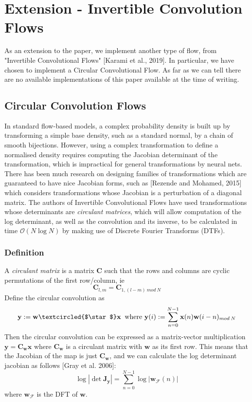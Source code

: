 \chapter{Extension - Invertible Convolution Flows}

As an extension to the paper, we implement another type of flow, from "Invertible Convolutional Flows" [Karami et al., 2019]. In particular, we have chosen to implement a Circular Convolutional Flow. As far as we can tell there are no available implementations of this paper available at the time of writing.

\section{Circular Convolution Flows}
In standard flow-based models, a complex probability density is built up by transforming a simple base density, such as a standard normal, by a chain of smooth bijections. However, using a complex transformation to define a normalised density requires computing the Jacobian determinant of the transformation, which is impractical for general transformations by neural nets. There has been much research on designing families of transformations which are guaranteed to have nice Jacobian forms, such as [Rezende and Mohamed, 2015] which considers transformations whose Jacobian is a perturbation of a diagonal matrix. The authors of Invertible Convolutional Flows have used transformations whose determinants are \textit{circulant matrices}, which will allow computation of the log determinant, as well as the convolution and its inverse, to be calculated in time $\mathcal{O}(N \log N)$ by making use of Discrete Fourier Transforms (DTFs).

\subsection{Definition}
A \textit{circulant matrix} is a matrix $\mathbf{C}$ such that the rows and columns are cyclic permutations of the first row/column, ie
\begin{equation}
	\mathbf{C}_{l,m} = \mathbf{C}_{1,(l-m) \: mod \: N}
\end{equation}
Define the circular convolution as
\begin{equation}
	\mathbf{y} := \mathbf{w} \textcircled{$\star$} \mathbf{x} \;\; \text{where } \mathbf{y}(i) := \sum_{n=0}^{N-1} \mathbf{x}(n)\mathbf{w}(i-n)_{mod\:N}
\end{equation}
Then the circular convolution can be expressed as a matrix-vector multiplication $\mathbf{y} = \mathbf{C_w x}$ where $\mathbf{C_w}$ is a circulant matrix with $\mathbf{w}$ as its first row. This means that the Jacobian of the map is just $\mathbf{C_w}$, and we can calculate the log determinant jacobian as follows [Gray et al. 2006]:
\begin{equation}
	\log |\det \mathbf{J_y}| = \sum_{n=0}^{N-1} \log |\mathbf{w_\mathcal{F}}(n)|
\end{equation}
where $\mathbf{w_\mathcal{F}}$ is the DFT of $\mathbf{w}$.

